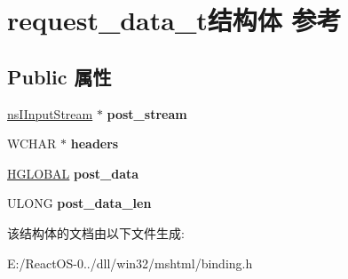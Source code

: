 \hypertarget{structrequest__data__t}{}\section{request\+\_\+data\+\_\+t结构体 参考}
\label{structrequest__data__t}
\subsection*{Public 属性}
\begin{DoxyCompactItemize}
\item 
\mbox{\label{structrequest__data__t_a98729f0001974c1a2681e838535c31cf}} 
\hyperlink{interfacens_i_input_stream}{ns\+I\+Input\+Stream} $\ast$ {\bfseries post\+\_\+stream}
\item 
\mbox{\label{structrequest__data__t_a477f87e9a2d016c047a07e938837977b}} 
W\+C\+H\+AR $\ast$ {\bfseries headers}
\item 
\mbox{\label{structrequest__data__t_ae67e070e788581145eddbf99cf929014}} 
\hyperlink{interfacevoid}{H\+G\+L\+O\+B\+AL} {\bfseries post\+\_\+data}
\item 
\mbox{\label{structrequest__data__t_a82f2cf8587178405b94afa330f033456}} 
U\+L\+O\+NG {\bfseries post\+\_\+data\+\_\+len}
\end{DoxyCompactItemize}


该结构体的文档由以下文件生成\+:\begin{DoxyCompactItemize}
\item 
E\+:/\+React\+O\+S-\/0../dll/win32/mshtml/binding.\+h\end{DoxyCompactItemize}
